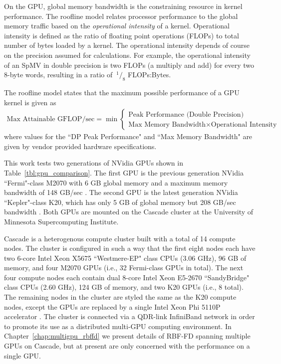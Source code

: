 \documentclass{report}
\begin{document}
On the GPU, global memory bandwidth is the constraining resource in kernel performance. The roofline model relates processor performance to the global memory traffic based on the \emph{operational intensity} of a kernel. Operational intensity is defined as the ratio of floating point operations (FLOPs) to total number of bytes loaded by a kernel. The operational intensity depends of course on the precision assumed for calculations. For example, the operational intensity of an SpMV in double precision is two FLOPs (a multiply and add) for every two 8-byte words, resulting in a ratio of $\ ^{1}/_{8}$ FLOPs:Bytes. 

The roofline model states that the maximum possible performance of a GPU kernel is given as
\begin{align}
\text{Max Attainable GFLOP/sec} = \min \begin{cases} \text{Peak Performance (Double Precision)} \\ \text{Max Memory Bandwidth} \times \text{Operational Intensity}  \end{cases}
\label{eq:roofline}
\end{align}
where values for the ``DP Peak Performance" and ``Max Memory Bandwidth" are given by vendor provided hardware specifications. 

This work tests two generations of NVidia GPUs shown in Table~\ref{tbl:gpu_comparison}. The first GPU is the previous generation NVidia ``Fermi"-class M2070 with 6 GB global memory and a maximum memory bandwidth of 148 GB/sec \cite{M2070FactSheet}. The second GPU is the latest generation NVidia ``Kepler"-class K20, which has only 5 GB of global memory but 208 GB/sec bandwidth \cite{KeplerFactSheet}. Both GPUs are mounted on the Cascade cluster at the University of Minnesota Supercomputing Institute. 

Cascade is a heterogenous compute cluster built with a total of 14 compute nodes. The cluster is configured in such a way that the first eight nodes each have two 6-core Intel Xeon X5675 ``Westmere-EP" class CPUs (3.06 GHz), 96 GB of memory, and four M2070 GPUs (i.e., 32 Fermi-class GPUs in total). The next four compute nodes each contain dual 8-core Intel Xeon E5-2670 ``SandyBridge" class CPUs (2.60 GHz), 124 GB of memory, and two K20 GPUs (i.e., 8 total). The remaining nodes in the cluster are styled the same as the K20 compute nodes, except the GPUs are replaced by a single Intel Xeon Phi 5110P accelerator \cite{IntelXeonPhi2013}. The cluster is connected via a QDR-link InfiniBand network in order to promote its use as a distributed multi-GPU computing environment. In Chapter~\ref{chap:multigpu_rbffd} we present details of RBF-FD spanning multiple GPUs on Cascade, but at present are only concerned with the performance on a single GPU. 
\end{document}
